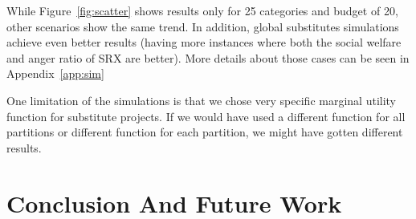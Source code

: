 \documentclass[runningheads]{llncs}
\newcommand{\kibitz}[2]{\ifnum\Comments=1{\color{#1}{#2}}\fi}
\newcommand{\rmr}[1]{\kibitz{red}{[Reshef says:#1]}}
\newcommand{\rf}[1]{\kibitz{blue}{[Roy says:#1]}}
\begin{document}
While Figure~\ref{fig:scatter} shows results only for 25 categories and budget of 20, other scenarios show the same trend. In addition, global substitutes simulations achieve even better results (having more instances where both the social welfare and anger ratio of SRX are better). More details about those cases can be seen in Appendix~\ref{app:sim}







 
 One limitation of the simulations is that we chose very specific marginal utility function for substitute projects. If we would have used a different function for all partitions or different function for each partition, we might have gotten different results. %


\section{Conclusion And Future Work}
\end{document}
